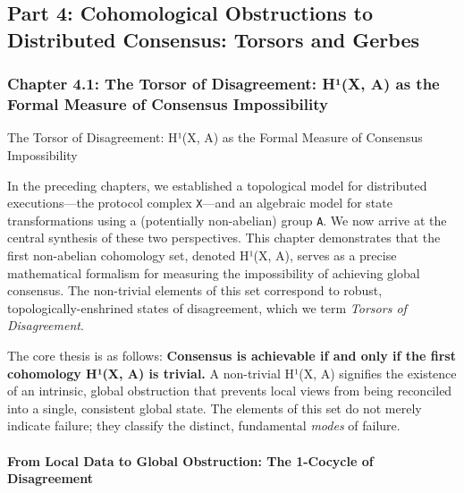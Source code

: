 \documentclass[
]{article}
\begin{document}
\subsection{Part 4: Cohomological Obstructions to Distributed Consensus:
Torsors and
Gerbes}\label{part-4-cohomological-obstructions-to-distributed-consensus-torsors-and-gerbes}

\protect{}\label{part-4-Cohomological_Obstructions_to_Distribute}{}

\subsubsection{Chapter 4.1: The Torsor of Disagreement: H¹(X, A) as the
Formal Measure of Consensus
Impossibility}\label{chapter-4.1-the-torsor-of-disagreement-huxb9x-a-as-the-formal-measure-of-consensus-impossibility}

\protect{}\label{chapter-4-1-The_Torsor_of_Disagreement__Huxb9_X__A__as}{}

The Torsor of Disagreement: H¹(X, A) as the Formal Measure of Consensus
Impossibility

In the preceding chapters, we established a topological model for
distributed executions---the protocol complex \texttt{X}---and an
algebraic model for state transformations using a (potentially
non-abelian) group \texttt{A}. We now arrive at the central synthesis of
these two perspectives. This chapter demonstrates that the first
non-abelian cohomology set, denoted H¹(X, A), serves as a precise
mathematical formalism for measuring the impossibility of achieving
global consensus. The non-trivial elements of this set correspond to
robust, topologically-enshrined states of disagreement, which we term
\emph{Torsors of Disagreement}.

The core thesis is as follows: \textbf{Consensus is achievable if and
only if the first cohomology H¹(X, A) is trivial.} A non-trivial H¹(X,
A) signifies the existence of an intrinsic, global obstruction that
prevents local views from being reconciled into a single, consistent
global state. The elements of this set do not merely indicate failure;
they classify the distinct, fundamental \emph{modes} of failure.

\paragraph{From Local Data to Global Obstruction: The 1-Cocycle of
Disagreement}\label{from-local-data-to-global-obstruction-the-1-cocycle-of-disagreement}
\end{document}

